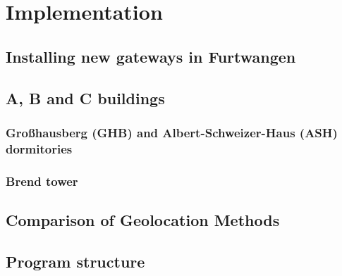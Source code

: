 \chapter{Implementation}

\section{Installing new gateways in Furtwangen}

\section{A, B and C buildings}

\subsection{Großhausberg (GHB) and Albert-Schweizer-Haus (ASH) dormitories}

\subsection{Brend tower}

\section{Comparison of Geolocation Methods}

\section{Program structure}